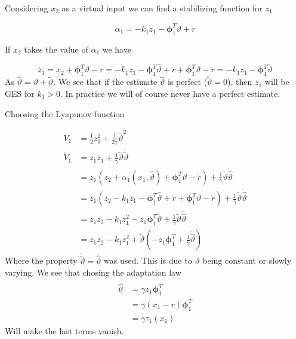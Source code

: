 \documentclass[12pt,a4]{article}
\begin{document}
Considering $x_2$ as a virtual input we can find a stabilizing function for $z_1$

\begin{equation}
	\alpha_1 = - k_1 z_1 -  \bm{\phi}_1^T \hat{\vartheta} + \dot{r}
\end{equation}

If $x_2$ takes the value of $\alpha_1$ we have

\begin{equation}
	\dot{z_1} = x_2 + \bm{\phi}_1^T \vartheta - \dot{r} = - k_1 z_1 -  \bm{\phi}_1^T \hat{\vartheta} + \dot{r}+\bm{\phi}_1^T \vartheta - \dot{r} = - k_1 z_1 - \bm{\phi}_1^T \tilde{\vartheta}
\end{equation}
As $\hat{\vartheta} = \vartheta + \tilde{\vartheta}$. We see that if the estimate $\hat{\vartheta}$ is perfect ($\tilde{\vartheta}=0$), then $z_1$ will be GES for $k_1>0$. In practice we will of course never have a perfect estimate.



Choosing the Lyapunov function

\begin{align}
	V_1       & = \frac{1}{2} z_1^2 + \frac{1}{2 \gamma} \tilde{\vartheta}^2                                                       \\
	\dot{V}_1 & = z_1 \dot{z_1}   +   \frac{1}{\gamma}\tilde{\vartheta}\dot{\tilde{\vartheta}}                                     \\
	          & = z_1 (z_2 + \alpha_1(x_1,\hat{\vartheta}) + \bm{\phi}_1^T \vartheta - \dot{r})
	+ \frac{1}{\gamma}\tilde{\vartheta}\dot{\hat{\vartheta}}                                                                       \\
	          & = z_1 (z_2 - k_1 z_1 -  \bm{\phi}_1^T \hat{\vartheta} + \dot{r} + \bm{\phi}_1^T \vartheta - \dot{r})
	+ \frac{1}{\gamma}\tilde{\vartheta}\dot{\hat{\vartheta}}                                                                       \\
	          & = z_1 z_2 - k_1 z_1^2 - z_1\bm{\phi}_1^T \tilde{\vartheta}
	+ \frac{1}{\gamma}\tilde{\vartheta}\dot{\hat{\vartheta}}                                                                       \\
	          & = z_1 z_2 - k_1 z_1^2 + \tilde{\vartheta} \left( -z_1\bm{\phi}_1^T + \frac{1}{\gamma}\dot{\hat{\vartheta}} \right)
\end{align}
Where the property $\dot{\tilde{\vartheta}} = \dot{\hat{\vartheta}}$ was used. This is due to $\vartheta$ being constant or slowly varying.
We see that chosing the adaptation law
\begin{align}
	\dot{\hat{\vartheta}} & = \gamma   z_1\bm{\phi}_1^T   \\
	                      & =\gamma(x_1 - r)\bm{\phi}_1^T \\
	                      & = \gamma \tau_1(x_1)
\end{align}
Will make the last terms vanish.
\end{document}

